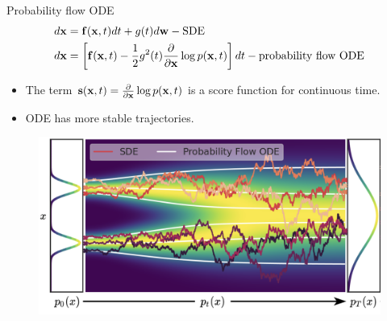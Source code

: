\begin{frame}{Probability flow ODE}
	\vspace{-0.5cm}
	\begin{align*}
		d\mathbf{x} &= \mathbf{f}(\mathbf{x}, t) dt + g(t) d \mathbf{w} - \text{SDE} \\
		d\mathbf{x} &= \left[\mathbf{f}(\mathbf{x}, t) -\frac{1}{2} g^2(t) \frac{\partial}{\partial \mathbf{x}} \log p(\mathbf{x}, t) \right] dt  - \text{probability flow ODE}
	\end{align*}
	\vspace{-0.3cm}
	\begin{itemize}
		\item The term $\mathbf{s}(\mathbf{x}, t) = \frac{\partial}{\partial \mathbf{x}} \log p(\mathbf{x}, t)$ is a score function for continuous time.
		\item ODE has more stable trajectories.
	\end{itemize}
	\begin{figure}
		\includegraphics[width=0.75\linewidth]{figs/probability_flow}
	\end{figure}
\end{frame}
